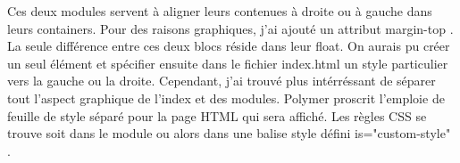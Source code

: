 \documentclass{article}
\begin{document}
Ces deux modules servent \`a aligner leurs contenues \`a droite ou \`a gauche dans leurs containers. Pour des raisons graphiques, j'ai ajout\'e un attribut \og margin-top \fg{}. La seule diff\'erence entre ces deux blocs r\'eside dans leur float. On aurais pu cr\'eer un seul \'el\'ement et sp\'ecifier ensuite dans le fichier index.html un style particulier vers la gauche ou la droite. Cependant, j'ai trouv\'e plus int\'err\'essant de s\'eparer tout l'aspect graphique de l'index et des modules. Polymer proscrit l'emploie de feuille de style s\'epar\'e pour la page HTML qui sera affich\'e. Les r\`egles CSS se trouve soit dans le module ou alors dans une balise style d\'efini \og is="custom-style" \fg{}.  
\vspace{0.5cm}\\
\end{document}
